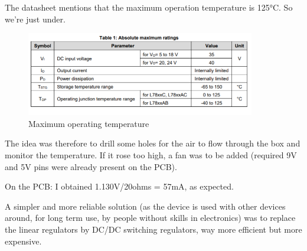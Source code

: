 \documentclass[a4paper]{article}
\begin{document}
The datasheet mentions that the maximum operation temperature is 125°C. So we're just under.


\begin{figure}[h!]
    \centering
    \includegraphics[width = 10cm]{images/thermalData2.png}
    \caption{Maximum operating temperature}
    \label{fig:thermalData2}
\end{figure}

The idea was therefore to drill some holes for the air to flow through the box and monitor the temperature. If it rose too high, a fan was to be added (required 9V and 5V pins were already present on the PCB).

On the PCB: I obtained 1.130V/20ohms = 57mA, as expected.

A simpler and more reliable solution (as the device is used with other devices around, for long term use, by people without skills in electronics) was to replace the linear regulators by DC/DC switching regulators, way more efficient but more expensive.

\newpage












\end{document}
